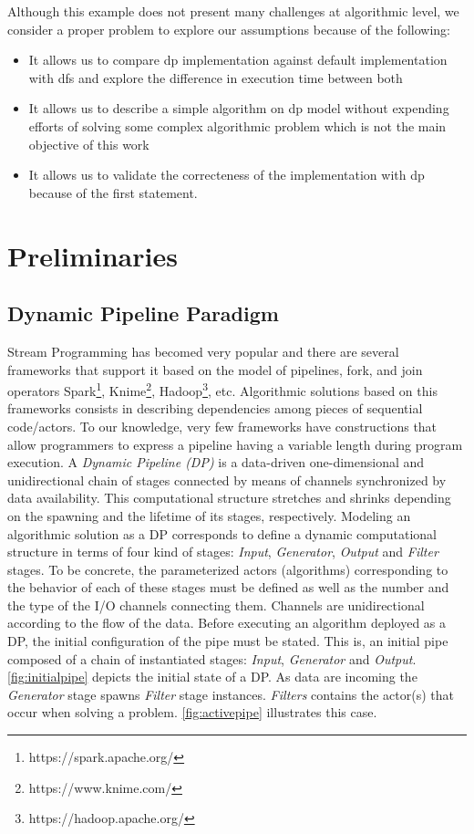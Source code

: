 \documentclass[preprint]{elsarticle}
\begin{document}
Although this example does not present many challenges at algorithmic level, we consider a proper problem to explore our assumptions because of the following:

\begin{itemize}
    \item It allows us to compare \acrshort{dp} implementation against default implementation with \acrshort{dfs} and explore the difference in execution time between both
    \item It allows us to describe a simple algorithm on \acrshort{dp} model without expending efforts of solving some complex algorithmic problem which is not the main objective of this work
    \item It allows us to validate the correcteness of the implementation with \acrshort{dp} because of the first statement.
\end{itemize}

\section{Preliminaries}\label{section:prelim}
\subsection{Dynamic Pipeline Paradigm}\label{sub:sec:dp:par}
%
Stream Programming has becomed very popular and there are several frameworks that support it  based on the model of pipelines, fork, and join operators Spark\footnote{https://spark.apache.org/}, Knime\footnote{https://www.knime.com/}, Hadoop\footnote{https://hadoop.apache.org/}, etc. Algorithmic solutions based on this frameworks consists in describing dependencies among pieces of sequential  code/actors. To our knowledge, very few frameworks have constructions that allow programmers to express a pipeline having a variable length during program execution. A \textit{Dynamic Pipeline  (DP)}  \cite{dpdef} is a data-driven one-dimensional and unidirectional chain of stages connected by means of channels synchronized by data availability. This computational structure stretches and shrinks depending on the spawning and the lifetime of its stages, respectively. Modeling an algorithmic solution as a DP corresponds to define a dynamic computational structure  in terms of four kind of stages:  \textit{Input},  \textit{Generator},  \textit{Output} and \textit{Filter} stages.  To be concrete, the parameterized actors (algorithms)  corresponding to the behavior of each of these stages must be defined as well as the number and the type of the I/O channels connecting them. Channels are unidirectional  according to the flow of the data. Before executing an algorithm deployed as a  DP, the initial configuration of the pipe must be stated. This is, an initial pipe composed of a chain of instantiated stages: \textit{Input},  \textit{Generator} and \textit{Output}. \autoref{fig:initialpipe} depicts the initial state of a DP.  As data are incoming  the \textit{Generator} stage spawns \textit{Filter} stage instances. \textit{Filters} contains the actor(s) that occur when solving a problem. \autoref{fig:activepipe} illustrates this case.
%
\end{document}
